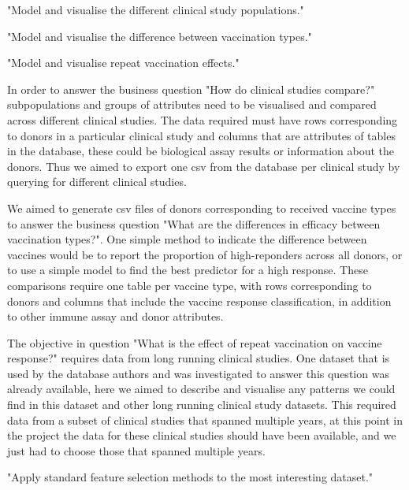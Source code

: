 \begin{displayquote}
"Model and visualise the different clinical study populations."
\end{displayquote}
\begin{displayquote}
"Model and visualise the difference between vaccination types."
\end{displayquote}
\begin{displayquote}
"Model and visualise repeat vaccination effects."
\end{displayquote}

In order to answer the business question "How do clinical studies compare?"
subpopulations and groups of attributes need to be visualised and compared
across different clinical studies. The data required must have rows
corresponding to donors in a particular clinical study and columns that are
attributes of tables in the database, these could be biological assay results
or information about the donors. Thus we aimed to export one csv from the
database per clinical study by querying for different clinical studies.

We aimed to generate csv files of donors corresponding to received vaccine
types to answer the business question "What are the differences in efficacy
between vaccination types?". One simple method to indicate the difference
between vaccines would be to report the proportion of high-reponders across all
donors, or to use a simple model to find the best predictor for a high
response. These comparisons require one table per vaccine type, with rows
corresponding to donors and columns that include the vaccine response
classification, in addition to other immune assay and donor attributes.

The objective in question "What is the effect of repeat vaccination on vaccine
response?" requires data from long running clinical studies. One dataset that
is used by the database authors and was investigated to answer this question
was already available, here we aimed to describe and visualise any patterns we
could find in this dataset and other long running clinical study datasets. This
required data from a subset of clinical studies that spanned multiple years, at
this point in the project the data for these clinical studies should have been
available, and we just had to choose those that spanned multiple years.

\begin{displayquote}
"Apply standard feature selection methods to the most interesting dataset."
\end{displayquote}

